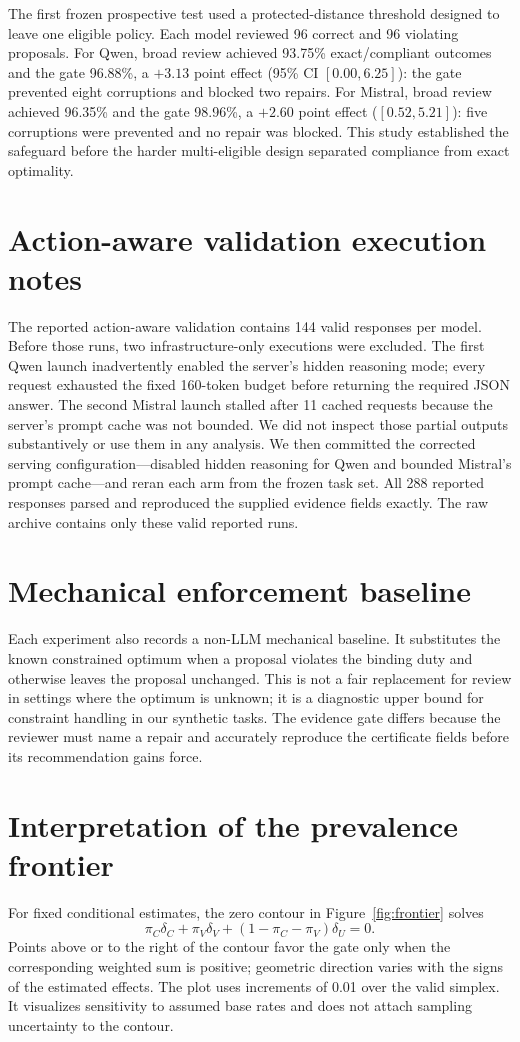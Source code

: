 \documentclass[10pt]{article}
\begin{document}
The first frozen prospective test used a protected-distance threshold designed
to leave one eligible policy. Each model reviewed 96 correct and 96 violating
proposals. For Qwen, broad review achieved 93.75\% exact/compliant outcomes and
the gate 96.88\%, a $+3.13$ point effect (95\% CI $[0.00,6.25]$): the gate
prevented eight corruptions and blocked two repairs. For Mistral, broad review
achieved 96.35\% and the gate 98.96\%, a $+2.60$ point effect
($[0.52,5.21]$): five corruptions were prevented and no repair was blocked.
This study established the safeguard before the harder multi-eligible design
separated compliance from exact optimality.

\section{Action-aware validation execution notes}

The reported action-aware validation contains 144 valid responses per model.
Before those runs, two infrastructure-only executions were excluded. The first
Qwen launch inadvertently enabled the server's hidden reasoning mode; every
request exhausted the fixed 160-token budget before returning the required JSON
answer. The second Mistral launch stalled after 11 cached requests because the
server's prompt cache was not bounded. We did not inspect those partial outputs
substantively or use them in any analysis. We then committed the corrected
serving configuration---disabled hidden reasoning for Qwen and bounded Mistral's
prompt cache---and reran each arm from the frozen task set. All 288 reported
responses parsed and reproduced the supplied evidence fields exactly. The raw
archive contains only these valid reported runs.

\section{Mechanical enforcement baseline}

Each experiment also records a non-LLM mechanical baseline. It substitutes the
known constrained optimum when a proposal violates the binding duty and otherwise
leaves the proposal unchanged. This is not a fair replacement for review in
settings where the optimum is unknown; it is a diagnostic upper bound for
constraint handling in our synthetic tasks. The evidence gate differs because
the reviewer must name a repair and accurately reproduce the certificate fields
before its recommendation gains force.

\section{Interpretation of the prevalence frontier}

For fixed conditional estimates, the zero contour in Figure~\ref{fig:frontier}
solves
\[
  \pi_C\delta_C+\pi_V\delta_V+(1-\pi_C-\pi_V)\delta_U=0.
\]
Points above or to the right of the contour favor the gate only when the
corresponding weighted sum is positive; geometric direction varies with the
signs of the estimated effects. The plot uses increments of 0.01 over the valid
simplex. It visualizes sensitivity to assumed base rates and does not attach
sampling uncertainty to the contour.
\end{document}
